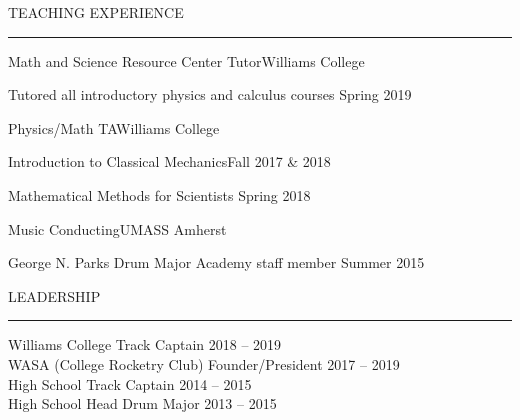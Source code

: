 \documentclass{resume} %
\renewenvironment{rSection}[1]{
	\sectionskip
	\textcolor{RoyalPurple}{\MakeUppercase{#1}}
	\sectionlineskip
	\hrule
	\begin{list}{}{
			\setlength{\leftmargin}{1.5em}
		}
		\item[]
	}{
	\end{list}
}
\begin{document}
\begin{rSection}{Teaching Experience} \itemsep -2pt
		\begin{rSubsection}{Math and Science Resource Center Tutor}{}{}{Williams College}{}
		\item {Tutored all introductory physics and calculus courses} \hfill {Spring 2019}
	\end{rSubsection}
	\begin{rSubsection}{Physics/Math TA}{}{}{Williams College}{}
		\item {Introduction to Classical Mechanics}\hfill{Fall 2017 \& 2018}
		\item {Mathematical Methods for Scientists} \hfill {Spring 2018}
		\end{rSubsection}
	\begin{rSubsection}{Music Conducting}{}{}{UMASS Amherst}{}
		\item {George N. Parks Drum Major Academy staff member} \hfill {Summer 2015}
	\end{rSubsection}
\end{rSection}




		\begin{rSection}{Leadership} \itemsep -2pt
		{Williams College Track Captain} \hfill {2018 -- 2019} \\
		{WASA (College Rocketry Club) Founder/President} \hfill {2017 -- 2019} \\
		{High School Track Captain} \hfill {2014 -- 2015}  \\
		{High School Head Drum Major} \hfill {2013 -- 2015}

	\end{rSection}
\end{document}
